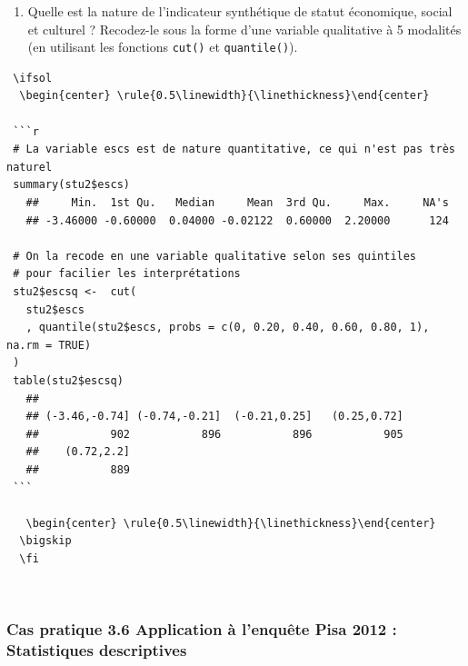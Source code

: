 \documentclass[12pt,twosided, notitlepage]{book}
\newif \ifsol
\begin{document}
\begin{enumerate}
\begin{enumerate}
    \begin{center} \rule{0.5\linewidth}{\linethickness}\end{center} 
     \bigskip 
     \fi
  \item
    Quelle est la nature de l'indicateur synthétique de statut
    économique, social et culturel ? Recodez-le sous la forme d'une
    variable qualitative à 5 modalités (en utilisant les fonctions
    \texttt{cut()} et
    \texttt{quantile()}).
  \end{enumerate}

\begin{verbatim}
 \ifsol 
  \begin{center} \rule{0.5\linewidth}{\linethickness}\end{center} 

 ```r
 # La variable escs est de nature quantitative, ce qui n'est pas très naturel
 summary(stu2$escs)
   ##     Min.  1st Qu.   Median     Mean  3rd Qu.     Max.     NA's 
   ## -3.46000 -0.60000  0.04000 -0.02122  0.60000  2.20000      124

 # On la recode en une variable qualitative selon ses quintiles
 # pour facilier les interprétations
 stu2$escsq <-  cut(
   stu2$escs
   , quantile(stu2$escs, probs = c(0, 0.20, 0.40, 0.60, 0.80, 1), na.rm = TRUE)
 )
 table(stu2$escsq)
   ## 
   ## (-3.46,-0.74] (-0.74,-0.21]  (-0.21,0.25]   (0.25,0.72] 
   ##           902           896           896           905 
   ##    (0.72,2.2] 
   ##           889
 ```

   \begin{center} \rule{0.5\linewidth}{\linethickness}\end{center} 
  \bigskip 
  \fi 
\end{verbatim}
\end{enumerate}

~

\hypertarget{cas-pratique-3.6-application-a-lenquete-pisa-2012-statistiques-descriptives}{%
\subsubsection{\texorpdfstring{\textbf{Cas pratique 3.6} Application à
l'enquête Pisa 2012 : Statistiques
descriptives}{Cas pratique 3.6 Application à l'enquête Pisa 2012 : Statistiques descriptives}}\label{cas-pratique-3.6-application-a-lenquete-pisa-2012-statistiques-descriptives}}

\end{document}
